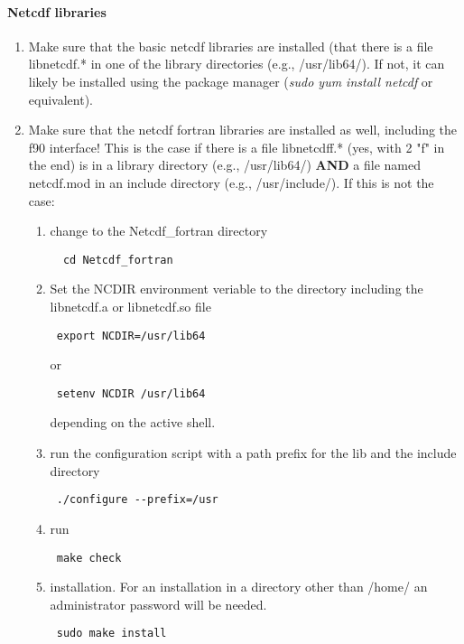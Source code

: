 \documentclass[11p,a4paper]{article}
\begin{document}
\paragraph{Netcdf libraries}
\begin{enumerate}
 \item Make sure that the basic netcdf libraries are installed (that there is a file libnetcdf.* in one of the library directories (e.g., /usr/lib64/). If not, it can likely be installed using the package manager (\textit{sudo yum install netcdf} or equivalent). 
 \item Make sure that the netcdf fortran libraries are installed as well, including the f90 interface! This is the case if there is a file libnetcdff.* (yes, with 2 "f" in the end) is in a library directory (e.g., /usr/lib64/) \textbf{AND} a file named netcdf.mod in an include directory (e.g., /usr/include/). If this is not the case:
 \begin{enumerate}
 \item change to the Netcdf\_fortran directory
 \begin{verbatim}
  cd Netcdf_fortran
 \end{verbatim}
 \item Set the NCDIR environment veriable to the directory including the libnetcdf.a or libnetcdf.so file
\begin{verbatim}
 export NCDIR=/usr/lib64
\end{verbatim}
or 
\begin{verbatim}
 setenv NCDIR /usr/lib64
\end{verbatim}
depending on the active shell.
\item run the configuration script with a path prefix for the lib and the include directory 
\begin{verbatim}
 ./configure --prefix=/usr
\end{verbatim}
\item run
\begin{verbatim}
 make check
\end{verbatim}
\item installation. For an installation in a directory other than /home/ an administrator password will be needed.
\begin{verbatim}
 sudo make install\end{verbatim}
\end{enumerate}  
\end{enumerate}
\end{document}

